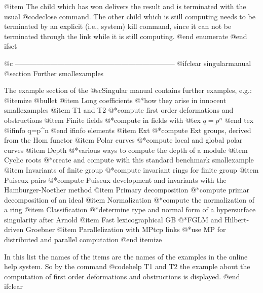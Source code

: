 @item
The child which has won delivers the result and is terminated with the usual
@code{close} command. The other child which is still computing needs to
be terminated by an explicit (i.e., system) kill command, since it can
not be terminated through the link while it is still computing.
@end enumerate
@end ifset

@c --------------------------------------------------------------------
@ifclear singularmanual
@section Further smallexamples

The example section of the @sc{Singular} manual contains further examples,
e.g.:
@itemize @bullet
@item Long coefficients
@*how they arise in innocent smallexamples
@item T1 and T2
@*compute first order deformations and obstructions
@item Finite fields
@*compute in fields with
@tex
$q=p^n$
@end tex
@ifinfo
q=p^n
@end ifinfo
elements
@item Ext
@*compute Ext groups, derived from the Hom functor
@item Polar curves
@*compute local and global polar curves
@item Depth
@*various ways to compute the depth of a module
@item Cyclic roots
@*create and compute with this standard benchmark smallexample
@item Invariants of finite group
@*compute invariant rings for finite group
@item Puiseux pairs
@*compute Puiseux development and invariants with the
Hamburger-Noether method
@item Primary decomposition
@*compute primar decomposition of an ideal
@item Normalization
@*compute the normalization of a ring
@item Classification
@*determine type and normal form of a hypersurface singularity
after Arnold
@item Fast lexicographical GB
@*FGLM and Hilbert-driven Groebner
@item Parallelization with MPtcp links
@*use MP for distributed and parallel computation
@end itemize

In this list the names of the items are the names of the
examples in the online help system. So by the command
@code{help T1 and T2} the example about the computation of
first order deformations and obstructions is displayed.
@end ifclear
